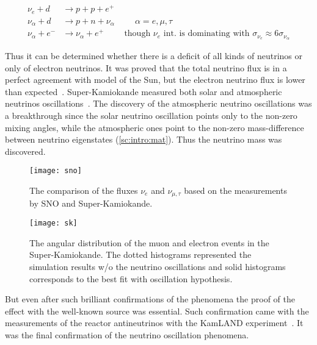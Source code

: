 \documentclass[../main.tex]{subfiles}
\begin{document}
\begin{align}
\nu_e+d&\to p+p+e^+ \\
\nu_\alpha+d&\to p+n+\nu_\alpha\hspace{1cm} \alpha =e,\mu,\tau \\
\nu_\alpha+e^-&\to\nu_\alpha+e^+ \hspace{1cm} \text{though } \nu_e \text{ int. is dominating with } \sigma_{\nu_e}\approx6\sigma_{\nu_\alpha}
\end{align}

Thus it can be determined whether there is a deficit of all kinds of neutrinos or only of electron neutrinos. It was proved that the total neutrino flux is in a perfect agreement with model of the Sun, but the electron neutrino flux is lower than expected~\cite{Ahmad2002}. Super-Kamiokande measured both solar and atmospheric neutrinos oscillations~\cite{Fukuda1999}. The discovery of the atmospheric neutrino oscillations was a breakthrough since the solar neutrino oscillation points only to the non-zero mixing angles, while the atmospheric ones point to the non-zero mass-difference between neutrino eigenstates (\autoref{sc:intro:mat}). Thus the neutrino mass was discovered.

\begin{figure}
  \centering
  \begin{minipage}{0.45\linewidth}
  \centering
    \texttt{[image: sno]}
    \caption{The comparison of the fluxes $\nu_e$ and $\nu_{\mu,\tau}$ based on the measurements by SNO and Super-Kamiokande.}
    \label{fig:intro:sno}
  \end{minipage}
  \begin{minipage}{0.09\linewidth}
    \hspace{\linewidth}
  \end{minipage}
  \begin{minipage}{0.45\linewidth}
  \centering
    \texttt{[image: sk]}
    \caption{The angular distribution of the muon and electron events in the Super-Kamiokande. The dotted histograms represented the simulation results w/o the neutrino oscillations and solid histograms corresponds to the best fit with oscillation hypothesis.}
    \label{fig:intro:sk}
  \end{minipage}
\end{figure}

But even after such brilliant confirmations of the phenomena the proof of the effect with the well-known source was essential. Such confirmation came with the measurements of the reactor antineutrinos with the KamLAND experiment~\cite{Eguchi2003}. It was the final confirmation of the neutrino oscillation phenomena.
\end{document}
